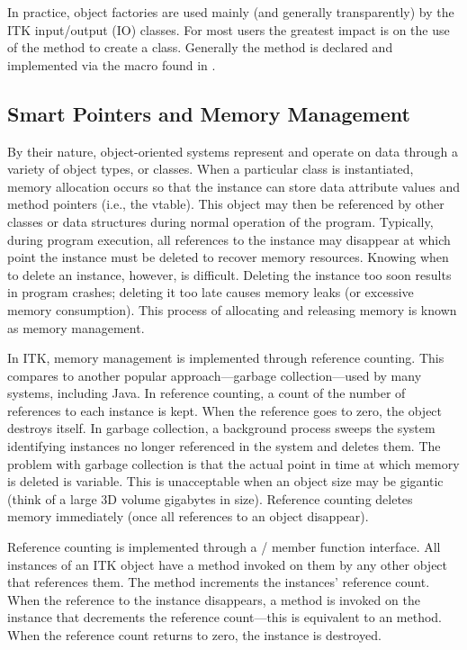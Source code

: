 In practice, object factories are used mainly (and generally transparently) by
the ITK input/output (IO) classes. For most users the greatest impact is on
the use of the  method to create a class. Generally the
 method is declared and implemented via the macro
 found in .


\subsection{Smart Pointers and Memory Management}
\label{sec:SmartPointers}


By their nature, object-oriented systems represent and operate on data through
a variety of object types, or classes. When a particular class is
instantiated, memory allocation occurs so that the instance can store data
attribute values and method pointers (i.e., the vtable).
This object may then be referenced by other classes or
data structures during normal operation of the program. Typically, during
program execution, all references to the instance may disappear at which point
the instance must be deleted to recover memory resources. Knowing when to
delete an instance, however, is difficult. Deleting the instance too soon
results in program crashes; deleting it too late causes memory leaks (or
excessive memory consumption). This process of allocating and
releasing memory is known as memory management.

In ITK, memory management is implemented through reference counting. This
compares to another popular approach---garbage collection---used
 by many systems, including Java.
In reference counting, a count of the number of
references to each instance is kept. When the reference goes to zero, the
object destroys itself. In garbage collection, a background process sweeps
the system identifying instances no longer referenced in the system and
deletes them. The problem with garbage collection is that the actual point in
time at which memory is deleted is variable. This is unacceptable when an
object size may be gigantic (think of a large 3D volume gigabytes in
size). Reference counting deletes memory immediately (once all references to
an object disappear).

Reference counting is implemented through a /
member function interface. All instances of an ITK object have a
 method invoked on them by any other object that references
them. The  method increments the instances' reference
count. When the reference to the instance disappears, a 
method is invoked on the instance that decrements the reference count---this
is equivalent to an  method. When the reference count
returns to zero, the instance is destroyed.


